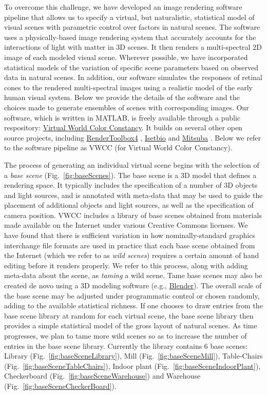 \documentclass{jov}
\begin{document}
To overcome this  challenge, we have developed an image rendering software pipeline that allows us to specify a virtual, but naturalistic, statistical model of visual scenes with parametric control over factors in natural scenes. The software uses a physically-based image rendering system that accurately accounts for the interactions of light with matter in 3D scenes. It then renders a multi-spectral 2D image of each modeled visual scene. Wherever possible, we have incorporated statistical models of the variation of specific scene parameters based on observed data in natural scenes. In addition, our software simulates the responses of retinal cones to the rendered multi-spectral images using a realistic model of the early human visual system. Below we provide the details of the software and the choices made to generate ensembles of scenes with corresponding images. Our software, which is written in MATLAB, is freely available through a public respository: \href{https://github.com/BrainardLab/VirtualWorldColorConstancy}{Virtual World Color Constancy}. It builds on several other open source projects, including \href{http://rendertoolbox.org}{RenderToolbox4} \cite{heasly2014rendertoolbox3}, \href{http://isetbio.org}{Isetbio} and \href{https://www.mitsuba-renderer.org}{Mitsuba} \cite{jakob2015mitsuba}. Below we refer to the software pipeline as VWCC (for Virtual World Color Constancy).

The process of generating an individual virtual scene begins with the selection of a \textit{base scene} (Fig.~\ref{fig:baseScenes}). The base scene is a 3D model that defines a rendering space.  It typically includes the specification of a number of 3D objects and light sources, and is annotated with meta-data that may be used to guide the placement of additional objects and light sources, as well as the specification of camera position. VWCC includes a library of base scenes obtained from materials made available on the Internet under various Creative Commons licenses. We have found that there is sufficient variation in how nominally-standard graphics interchange file formats are used in practice that each base scene obtained from the Internet (which we refer to as \textit{wild scenes}) requires a certain amount of hand editing before it renders properly. We refer to this process, along with adding meta-data about the scene, as \textit{taming} a wild scene. Tame base scenes may also be created de novo using a 3D modeling software (e.g., \href{https://www.blender.org/}{Blender}).  The overall scale of the base scene may be adjusted under programmatic control or chosen randomly, adding to the available statistical richness. If one chooses to draw entries from the base scene library at random for each virtual scene, the base scene library then provides a simple statistical model of the gross layout of natural scenes. As time progresses, we plan to tame more wild scenes so as to increase the number of entries in the base scene library. Currently the library contains 6 base scenes: Library (Fig.~\ref{fig:baseSceneLibrary}), Mill (Fig.~\ref{fig:baseSceneMill}), Table-Chairs (Fig.~\ref{fig:baseSceneTableChairs}), Indoor plant (Fig.~\ref{fig:baseSceneIndoorPlant}), Checkerboard (Fig.~\ref{fig:baseSceneWarehouse}) and Warehouse (Fig.~\ref{fig:baseSceneCheckerBoard}).
\end{document}
